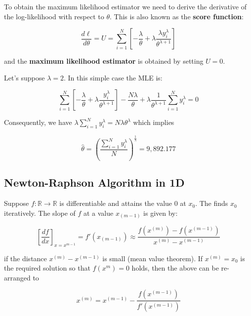 \documentclass[11pt]{article}
\begin{document}
To obtain the maximum likelihood estimator we need to derive the derivative of the log-likelihood with respect to \(\theta\). This is also known as the \textbf{score function}:

\begin{equation}
    \frac{d\ell}{d\theta} = U = \sum_{i=1}^{N} \left[ -\frac{\lambda}{\theta} + \lambda \frac{\lambda y_i^{\lambda}}{\theta^{\lambda+1}} \right]
\end{equation}

and the \textbf{maximum likelihood estimator} is obtained by setting \(U = 0\).

Let's suppose \(\lambda = 2\). In this simple case the MLE is:

\begin{equation}
    \sum_{i=1}^{N} \left[ -\frac{\lambda}{\theta} + \lambda \frac{y_i^\lambda}{\theta^{\lambda+1}} \right] -\frac{N\lambda}{\theta} + \lambda \frac{1}{\theta^{\lambda+1}} \sum_{i=1}^{N} y_i^\lambda = 0
\end{equation}

Consequently, we have \(\lambda \sum_{i=1}^{N} y_i^\lambda = N\lambda\theta^\lambda\) which implies

\begin{equation}
    \hat{\theta} = \left( \frac{\sum_{i=1}^{N} y_i^\lambda}{N} \right)^{\frac{1}{\lambda}} = 9,892.177
\end{equation}

\subsection{Newton-Raphson Algorithm in 1D}

Suppose \(f: \mathbb{R} \rightarrow \mathbb{R} \) is differentiable and attains the value 0 at \( x_0 \).
The  finds \( x_0 \) iteratively. The slope of \( f \) at a value \( x_{(m-1)} \) is given by:

\begin{equation}
    \left[ \dfrac{df}{dx}\right]_{x=x^{m-1}} = f'(x_{(m-1)}) \approx \dfrac{f(x^{(m)}) - f(x^{(m-1)})}{x^{(m)} - x^{(m-1)}}
\end{equation}

if the distance \( x^{(m)} - x^{(m-1)} \) is small (mean value theorem). If \( x^{(m)} = x_0 \) is the required solution so that \( f(x^m) = 0 \) holds, then the above can be re-arranged to

\begin{equation}
    x^{(m)} = x^{(m-1)} - \dfrac{f(x^{(m-1)})}{f'(x^{(m-1)})}
\end{equation}
\end{document}
